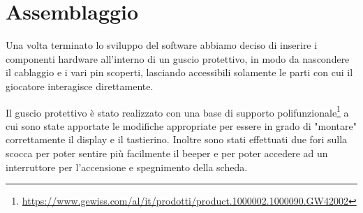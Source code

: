 \documentclass[a4paper]{article}
\begin{document}
\section{Assemblaggio}

Una volta terminato lo sviluppo del software abbiamo deciso di inserire i componenti hardware
all'interno di un guscio protettivo, in modo da nascondere il cablaggio e i vari pin scoperti,
lasciando accessibili solamente le parti con cui il giocatore interagisce direttamente.

Il guscio protettivo è stato realizzato con una base di supporto
polifunzionale\footnote{\url{https://www.gewiss.com/al/it/prodotti/product.1000002.1000090.GW42002}}
a cui sono state apportate le modifiche appropriate per essere in grado di "montare" correttamente
il display e il tastierino. Inoltre sono stati effettuati due fori sulla scocca per poter sentire
più facilmente il beeper e per poter accedere ad un interruttore per l'accensione e spegnimento
della scheda.
\end{document}
